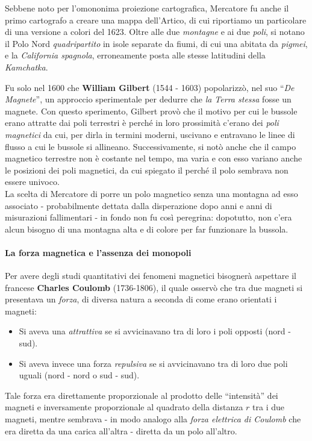 \begin{digressionwt}
\begin{center}
	\end{center}
\begin{center}
	{\scriptsize Sebbene noto per l'omononima proiezione cartografica, Mercatore fu anche il primo cartografo a creare una mappa dell'Artico, di cui riportiamo un particolare di una versione a colori del 1623. Oltre alle due \textit{montagne} e ai due \textit{poli}, si notano il Polo Nord \textit{quadripartito} in isole separate da fiumi, di cui una abitata da \textit{pigmei}, e la \textit{California spagnola}, erroneamente posta alle stesse latitudini della \textit{Kamchatka}.}%
\end{center}
	Fu solo nel 1600 che \textbf{William Gilbert} (1544 - 1603) popolarizzò, nel suo ``\textit{De Magnete}'', un approccio sperimentale per dedurre che \textit{la Terra stessa} fosse un magnete. Con questo sperimento, Gilbert provò che il motivo per cui le bussole erano attratte dai poli terrestri è perché in loro prossimità c'erano dei \textit{poli magnetici} da cui, per dirla in termini moderni, uscivano e entravano le linee di flusso a cui le bussole si allineano. Successivamente, si notò anche che il campo magnetico terrestre non è costante nel tempo, ma varia e con esso variano anche le posizioni dei poli magnetici, da cui spiegato il perché il polo sembrava non essere univoco.\\
	La scelta di Mercatore di porre un polo magnetico senza una montagna ad esso associato - probabilmente dettata dalla disperazione dopo anni e anni di misurazioni fallimentari - in fondo non fu così peregrina: dopotutto, non c'era alcun bisogno di una montagna alta e di colore per far funzionare la bussola.
\end{digressionwt}
\paragraph{La forza magnetica e l'assenza dei monopoli}
Per avere degli studi quantitativi dei fenomeni magnetici bisognerà aspettare il francese \textbf{Charles Coulomb} (1736-1806), il quale osservò che tra due magneti si presentava un \textit{forza}, di diversa natura a seconda di come erano orientati i magneti:
\begin{itemize}
	\item Si aveva una \textit{attrattiva} se si avvicinavano tra di loro i poli opposti (nord - sud).
	\item Si aveva invece una forza \textit{repulsiva} se si avvicinavano tra di loro due poli uguali (nord - nord o sud - sud).
\end{itemize}
Tale forza era direttamente proporzionale al prodotto delle ``intensità'' dei magneti e inversamente proporzionale al quadrato della distanza $r$ tra i due magneti, mentre sembrava - in modo analogo alla \textit{forza elettrica di Coulomb} che era diretta da una carica all'altra - diretta da un polo all'altro.


